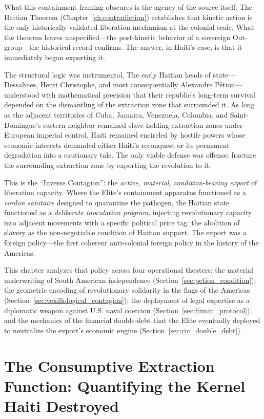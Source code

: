 What this containment framing obscures is the agency of the source itself. The Haitian Theorem (Chapter~\ref{ch:contradiction}) establishes that kinetic action is the only historically validated liberation mechanism at the colonial scale. What the theorem leaves unspecified---the post-kinetic behavior of a sovereign Out-group---the historical record confirms. The answer, in Haiti's case, is that it immediately began exporting it.

The structural logic was instrumental. The early Haitian heads of state---Dessalines, Henri Christophe, and most consequentially Alexandre Pétion---understood with mathematical precision that their republic's long-term survival depended on the dismantling of the extraction zone that surrounded it. As long as the adjacent territories of Cuba, Jamaica, Venezuela, Colombia, and Saint-Domingue's eastern neighbor remained slave-holding extraction zones under European imperial control, Haiti remained encircled by hostile powers whose economic interests demanded either Haiti's reconquest or its permanent degradation into a cautionary tale. The only viable defense was offense: fracture the surrounding extraction zone by exporting the revolution to it.

This is the ``Inverse Contagion'': the \textit{active, material, condition-bearing export} of liberation capacity. Where the Elite's containment apparatus functioned as a \textit{cordon sanitaire} designed to quarantine the pathogen, the Haitian state functioned as a \textit{deliberate inoculation program}, injecting revolutionary capacity into adjacent movements with a specific political price tag: the abolition of slavery as the non-negotiable condition of Haitian support. The export was a foreign policy---the first coherent anti-colonial foreign policy in the history of the Americas.

This chapter analyzes that policy across four operational theaters: the material underwriting of South American independence (Section~\ref{sec:petion_condition}); the geometric encoding of revolutionary solidarity in the flags of the Americas (Section~\ref{sec:vexillological_contagion}); the deployment of legal expertise as a diplomatic weapon against U.S. naval coercion (Section~\ref{sec:firmin_protocol}); and the mechanics of the financial double-debt that the Elite eventually deployed to neutralize the export's economic engine (Section~\ref{sec:cic_double_debt}).

\section{The Consumptive Extraction Function: Quantifying the Kernel Haiti Destroyed}
\label{sec:consumptive_function}

